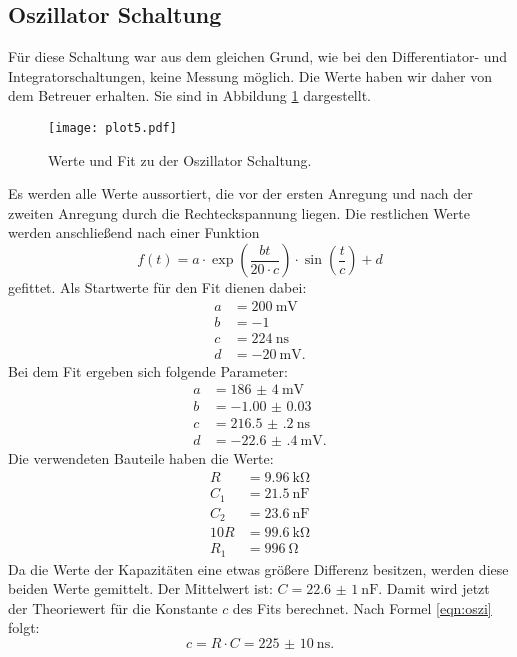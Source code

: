 \documentclass[
  bibliography=totoc,     %
  captions=tableheading,  %
  titlepage=firstiscover, %
]{scrartcl}
\begin{document}
\subsection{Oszillator Schaltung}
Für diese Schaltung war aus dem gleichen Grund, wie bei den Differentiator- und
Integratorschaltungen, keine Messung möglich. Die Werte haben wir daher
von dem Betreuer erhalten. Sie sind in Abbildung \ref{fig:plot5} dargestellt.
\begin{figure}[H]
  \centering
  \texttt{[image: plot5.pdf]}
  \caption{Werte und Fit zu der Oszillator Schaltung.}
  \label{fig:plot5}
\end{figure}
\noindent
Es werden alle Werte aussortiert, die vor der ersten Anregung und nach der zweiten
Anregung durch die Rechteckspannung liegen. Die restlichen Werte werden anschließend
nach einer Funktion
\begin{equation*}
  f(t) = a \cdot \exp{\left(\frac{bt}{20 \cdot c}\right)} \cdot \sin{\left(\frac{t}{c}\right)} + d
\end{equation*}
gefittet.
Als Startwerte für den Fit dienen dabei:
\begin{align*}
  a &= \SI{200}{\milli\volt} \\
  b &= \SI{-1}{} \\
  c &= \SI{224}{\nano\second} \\
  d &= \SI{-20}{\milli\volt}.
\end{align*}
Bei dem Fit ergeben sich folgende Parameter:
\begin{align*}
  a &= \SI{186(4)}{\milli\volt} \\
  b &= \SI{-1.00(3)}{} \\
  c &= \SI{216.5(2)}{\nano\second} \\
  d &= \SI{-22.6(4)}{\milli\volt}.
\end{align*}
Die verwendeten Bauteile haben die Werte:
\begin{align*}
  R &= \SI{9.96}{\kilo\ohm} \\
  C_1 &= \SI{21.5}{\nano\farad} \\
  C_2 &= \SI{23.6}{\nano\farad} \\
  10R &= \SI{99.6}{\kilo\ohm} \\
  R_1 &= \SI{996}{\ohm}
\end{align*}
Da die Werte der Kapazitäten eine etwas größere Differenz besitzen, werden diese
beiden Werte gemittelt. Der Mittelwert ist: $C = \SI{22.6(10)}{\nano\farad}$.
Damit wird jetzt der Theoriewert für die Konstante $c$ des Fits berechnet.
Nach Formel \eqref{eqn:oszi} folgt:
\begin{equation*}
  c = R \cdot C = \SI{225(10)}{\nano\second}.
\end{equation*}
\end{document}
